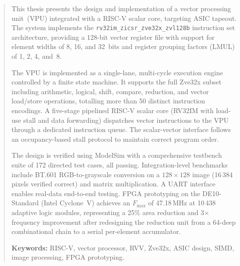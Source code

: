 \documentclass[12pt,a4paper,oneside]{book}
\numberwithin{equation}{chapter}
\begin{document}
\begin{abstract}
\noindent
This thesis presents the design and implementation of a vector processing unit~(VPU)
integrated with a RISC-V scalar core, targeting ASIC tapeout. The system implements
the \texttt{rv32im\_zicsr\_zve32x\_zvl128b} instruction set architecture, providing
a 128-bit vector register file with support for element widths of 8, 16, and 32~bits
and register grouping factors (LMUL) of 1, 2, 4, and~8.

The VPU is implemented as a single-lane, multi-cycle execution engine controlled by a
finite state machine. It supports the full Zve32x subset including arithmetic,
logical, shift, compare, reduction, and vector load/store operations, totalling more
than 50 distinct instruction encodings. A five-stage pipelined RISC-V scalar core
(RV32IM with load-use stall and data forwarding) dispatches vector instructions to the
VPU through a dedicated instruction queue. The scalar-vector interface follows an
occupancy-based stall protocol to maintain correct program order.

The design is verified using ModelSim with a comprehensive testbench suite of 172
directed test cases, all passing. Integration-level benchmarks include BT.601
RGB-to-grayscale conversion on a $128\times128$ image (16\,384 pixels verified
correct) and matrix multiplication. A UART interface enables real-data end-to-end
testing. FPGA prototyping on the DE10-Standard (Intel Cyclone~V) achieves an
$F_\text{max}$ of 47.18\,MHz at 10\,438 adaptive logic modules, representing a 25\%
area reduction and 3$\times$ frequency improvement after redesigning the reduction
unit from a 64-deep combinational chain to a serial per-element accumulator.

\medskip
\noindent\textbf{Keywords:} RISC-V, vector processor, RVV, Zve32x, ASIC design,
SIMD, image processing, FPGA prototyping.
\end{abstract}

\tableofcontents
\listoffigures
\listoftables
\printglossary[type=\acronymtype, title=List of Abbreviations, toctitle=List of Abbreviations]

\mainmatter
\pagestyle{fancy}









\backmatter


\end{document}
